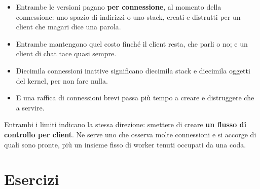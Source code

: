 \begin{itemize}
    \item Entrambe le versioni pagano \textbf{per connessione}, al momento della connessione: uno spazio di indirizzi o uno
          stack, creati e distrutti per un client che magari dice una parola.
    \item Entrambe mantengono quel costo finché il client resta, che parli o no; e un client di chat tace quasi sempre.
    \item Diecimila connessioni inattive significano diecimila stack e diecimila oggetti del kernel, per non fare nulla.
    \item E una raffica di connessioni brevi passa più tempo a creare e distruggere che a servire.
\end{itemize}

Entrambi i limiti indicano la stessa direzione: smettere di creare \textbf{un flusso di controllo per client}. Ne serve uno
che osserva molte connessioni e si accorge di quali sono pronte, più un insieme fisso di worker tenuti occupati da una
coda.

\section{Esercizi}

